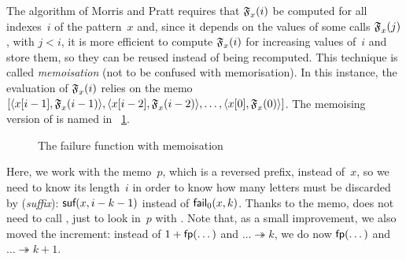The algorithm of Morris and Pratt requires that \(\mathfrak{F}_{x}^{}(i)\)
be computed for all indexes~\(i\) of the pattern~\(x\) and, since it
depends on the values of some calls \(\mathfrak{F}_{x}^{}(j)\), with \(j <
i\), it is more efficient to compute \(\mathfrak{F}_{x}^{}(i)\) for
increasing values of~\(i\) and store them, so they can be reused
instead of being recomputed. This technique is called
\emph{memoisation} (not to be confused with
memorisation). In this instance, the evaluation of
\(\mathfrak{F}_{x}^{}(i)\) relies on the memo
\([\langle{{x}[{i-1}]},{\mathfrak{F}_{x}^{}(i-1)}\rangle,
\langle{{x}[{i-2}]},{\mathfrak{F}_{x}^{}(i-2)}\rangle, \dots,
\langle{{x}[{0}]},{\mathfrak{F}_{x}^{}(0)}\rangle]\). The memoising version of
 is named  in
\fig~\ref{fig:fail}.
\begin{figure}[b]
\centering
\abovedisplayskip=0pt
\belowdisplayskip=0pt
\caption{The failure function with memoisation\label{fig:fail}}
\end{figure}
Here, we work with the memo~\(p\), which is a reversed prefix, instead
of~\(x\), so we need to know its length~\(i\) in order to know how
many letters must be discarded by 
(\emph{suffix}): \(\textsf{suf}(x,i-k-1)\) instead of
\(\textsf{fail}_0(x,k)\). Thanks to the memo,  does not need to
call , just to look in~\(p\) with . Note that,
as a small improvement, we also moved the increment: instead of \(1 +
\textsf{fp}(\dots)\) and \(\dots \twoheadrightarrow k\), we do now
\(\textsf{fp}(\dots)\) and \(\dots \twoheadrightarrow k+1\).

